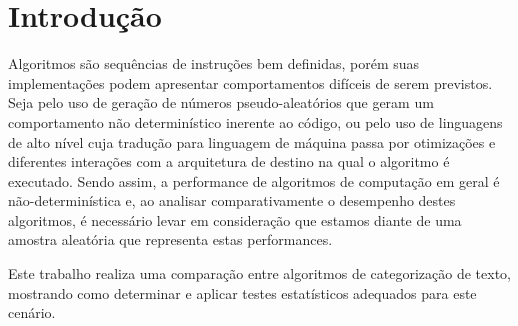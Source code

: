 \documentclass[conference]{IEEEtran}
\begin{document}

\section{Introdução}
\label{sec:intro}

Algoritmos são sequências de instruções bem definidas, porém suas implementações podem apresentar comportamentos difíceis de serem previstos.
Seja pelo uso de geração de números pseudo-aleatórios que geram um comportamento não determinístico inerente ao código, ou pelo uso de linguagens de alto nível cuja tradução para linguagem de máquina passa por otimizações e diferentes interações com a arquitetura de destino na qual o algoritmo é executado.
Sendo assim, a performance de algoritmos de computação em geral é não-determinística e, ao analisar comparativamente o desempenho destes algoritmos, é necessário levar em consideração que estamos diante de uma amostra aleatória que representa estas performances.

Este trabalho realiza uma comparação entre algoritmos de categorização de texto, mostrando como determinar e aplicar testes estatísticos adequados para este cenário.
\end{document}
